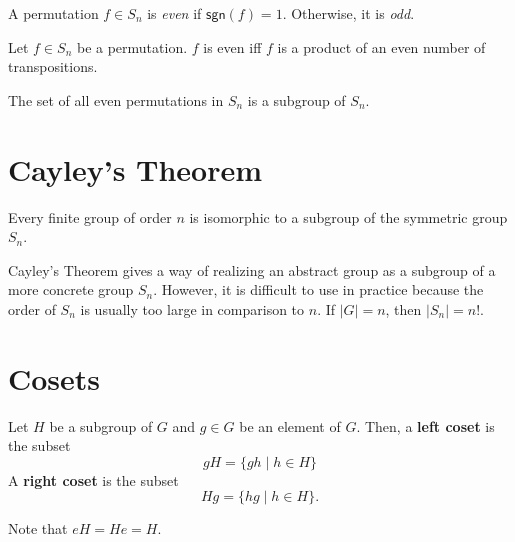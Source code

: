 \documentclass{article}
\begin{document}
\begin{definition}
  A permutation $f \in S_n$ is \emph{even} if $\mathsf{sgn}(f) = 1$. Otherwise, it is \emph{odd}.
\end{definition}

\begin{theorem}
  Let $f \in S_n$ be a permutation. $f$ is even iff $f$ is a product of an even number of transpositions.
\end{theorem}

\begin{proposition}
  The set of all even permutations in $S_n$ is a subgroup of $S_n$.
\end{proposition}

\section{Cayley's Theorem}

\begin{theorem}
  Every finite group of order $n$ is isomorphic to a subgroup of the symmetric group $S_n$.
\end{theorem}

Cayley's Theorem gives a way of realizing an abstract group as a subgroup of a more concrete group $S_n$. However, it is difficult to use in practice because the order of $S_n$ is usually too large in comparison to $n$. If $|G| = n$, then $|S_n| = n!$.

\section{Cosets}

\begin{definition}[Coset]
  Let $H$ be a subgroup of $G$ and $g \in G$ be an element of $G$. Then, a \textbf{left coset} is the subset
  $$
  gH = \{gh \mid h \in H\}
  $$
  A \textbf{right coset} is the subset
  $$
  Hg = \{hg \mid h \in H\}.
  $$
\end{definition}

Note that $eH = He = H$.
\end{document}
